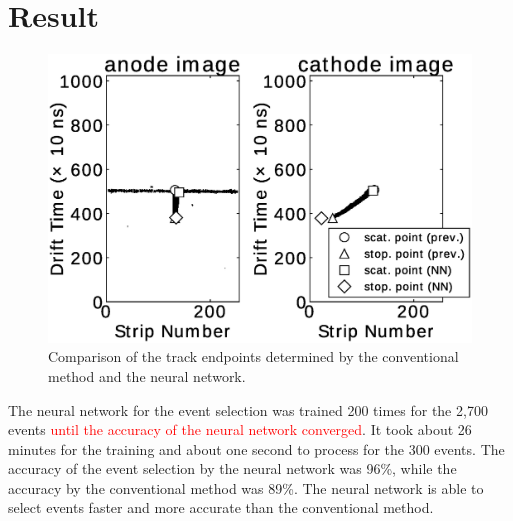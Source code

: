 \documentclass{jps-cp}
\begin{document}
\section{Result}
\begin{figure}
  \vspace{-3zw}
  \centering
  \includegraphics[clip, width=25zw]{eps/compare_mono_v4.eps}
  \caption{Comparison of the track endpoints determined by the conventional method and the neural network.}
  \label{fig:result_detection}
  \vspace{-2zw}
\end{figure}

The neural network for the event selection was trained 200 times for the 2,700 events
\textcolor{red}{until the accuracy of the neural network converged}.
It took about 26 minutes for the training and about one second to process for the 300 events.
The accuracy of the event selection by the neural network was 96\%,
while the accuracy by the conventional method was 89\%.
The neural network is able to select events faster and more accurate than the conventional method.

\end{document}
